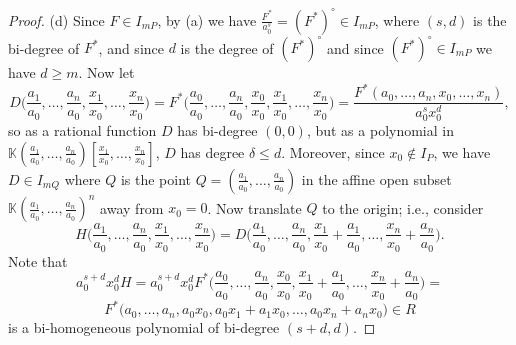\documentclass[12pt]{amsart}
\numberwithin{equation}{section}
\theoremstyle{definition}
\newcommand{\KK}{ \ensuremath{\mathbb{K}}}
\begin{document}
\begin{proof}
(d) Since $F\in I_{mP}$, by (a) we have $\frac{F^*}{a_0^s}=(F^*)^\circ\in I_{mP}$, where $(s,d)$ is the bi-degree of $F^*$,
and since $d$ is the degree of $(F^*)^\circ$ and since $(F^*)^\circ\in I_{mP}$ we have $d\geq m$. 
Now let 
$$D\big(\frac{a_1}{a_0},\ldots,\frac{a_n}{a_0},\frac{x_1}{x_0},\ldots,\frac{x_n}{x_0}\big)=
F^*\big(\frac{a_0}{a_0},\ldots,\frac{a_n}{a_0},\frac{x_0}{x_0},\frac{x_1}{x_0},\ldots,\frac{x_n}{x_0}\big)=\frac{F^*(a_0,\ldots,a_n,x_0,\ldots,x_n)}{a_0^sx_0^d},$$
so as a rational function $D$ has bi-degree $(0,0)$, but as a polynomial in
$\KK(\frac{a_1}{a_0},\ldots,\frac{a_n}{a_0})[\frac{x_1}{x_0},\ldots,\frac{x_n}{x_0}]$, $D$ has degree $\delta\leq d$.
Moreover, since $x_0\not\in I_P$, we have $D\in I_{mQ}$ where $Q$ is the point $Q=(\frac{a_1}{a_0},\ldots,\frac{a_n}{a_0})$
in the affine open subset $\KK(\frac{a_1}{a_0},\ldots,\frac{a_n}{a_0})^n$ away from $x_0=0$. Now translate $Q$ to the origin; i.e., consider
$$H\big(\frac{a_1}{a_0},\ldots,\frac{a_n}{a_0},\frac{x_1}{x_0},\ldots,\frac{x_n}{x_0}\big)=
D\big(\frac{a_1}{a_0},\ldots,\frac{a_n}{a_0},\frac{x_1}{x_0}+\frac{a_1}{a_0},\ldots,\frac{x_n}{x_0}+\frac{a_n}{a_0}\big).$$
Note that 
$$a_0^{s+d}x_0^dH=a_0^{s+d}x_0^dF^*\big(\frac{a_0}{a_0},\ldots,\frac{a_n}{a_0},\frac{x_0}{x_0},\frac{x_1}{x_0}+\frac{a_1}{a_0},\ldots,\frac{x_n}{x_0}+\frac{a_n}{a_0}\big)=$$
$$F^*\big(a_0,\ldots,a_n,a_0x_0,a_0x_1+a_1x_0,\ldots,a_0x_n+a_nx_0\big)\in R$$
is a bi-homogeneous polynomial of bi-degree $(s+d,d)$.


\end{proof}
\end{document}
